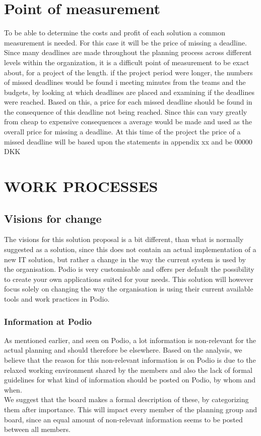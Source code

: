 \section{Point of measurement}
To be able to determine the costs and profit of each solution a common measurement is needed. For this case it will be the price of missing a deadline. Since many deadlines are made throughout the planning process across different levels within the organization, it is a difficult point of measurement to be exact about, for a project of the length. if the project period were longer, the numbers of missed deadlines would be found i meeting minutes from the teams and the budgets, by looking at which deadlines are placed and examining if the deadlines were reached. Based on this, a price for each missed deadline should be found in the consequence of this deadline not being reached. Since this can vary greatly from cheap to expensive consequences a average would be made and used as the overall price for missing a deadline. At this time of the project the price of a missed deadline will be based upon the statements in appendix xx and be 00000 DKK

\section{WORK PROCESSES}
\subsection{Visions for change}
The visions for this solution proposal is a bit different, than what is normally suggested as a
solution, since this does not contain an actual implementation of a new IT solution, but rather a
change in the way the current system is used by the organisation.
Podio is very customisable and offers per default the possibility to create your own applications
suited for your needs. This solution will however focus solely on changing the way the organisation
is using their current available tools and work practices in Podio.


\subsubsection{Information at Podio}
As mentioned earlier, and seen on Podio, a lot information is non-relevant for the actual planning and should therefore be elsewhere. Based on the analysis, we believe that the reason for this non-relevant information is on Podio is due to the relaxed working environment shared by the members and also the lack of formal guidelines for what kind of information should be posted on Podio, by whom and when.\\ 
We suggest that the board makes a formal description of these, by categorizing them after importance.
This will impact every member of the planning group and board, since an equal amount of non-relevant information seems to be posted between all members. \\

